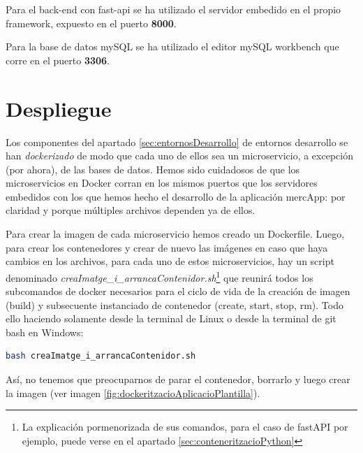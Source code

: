 \documentclass[a4paper,12pt]{report}
\begin{document}
				Para el back-end con fast-api se ha utilizado el servidor embedido en el propio framework, expuesto en el puerto \textbf{8000}.
				
				Para la base de datos mySQL se ha utilizado el editor mySQL workbench que corre en el puerto \textbf{3306}.
		
	
			\section{Despliegue}
			\label{sec:despliegue}
				Los componentes del apartado \ref{sec:entornosDesarrollo} de entornos  desarrollo se han \textit{dockerizado} de modo que cada uno de ellos sea un microservicio, a excepción (por ahora), de las bases de datos. Hemos sido cuidadosos de que los microservicios en Docker corran en los mismos puertos que los servidores embedidos con los que hemos hecho el desarrollo de la aplicación mercApp: por claridad y porque múltiples archivos dependen ya de ellos.
				
				Para crear la imagen de cada microservicio hemos creado un Dockerfile. Luego, para crear los contenedores y crear de nuevo las imágenes en caso que haya cambios en los archivos, para cada uno de estos microservicios, hay un script denominado \textit{creaImatge\_i\_arrancaContenidor.sh}\footnote{La explicación pormenorizada de sus comandos, para el caso de fastAPI por ejemplo, puede verse en el apartado \ref{sec:conteneritzacioPython}} que reunirá todos los subcomandos de docker necesarios para el ciclo de vida de la creación de imagen (build) y subsecuente instanciado de contenedor (create, start, stop, rm). Todo ello haciendo solamente desde la terminal de Linux o desde la terminal de git bash en Windows: 
				
				\begin{lstlisting}[language=bash]
	bash creaImatge_i_arrancaContenidor.sh
				\end{lstlisting}
				
				
				
				
				
				Así, no tenemos que preocuparnos de parar el contenedor, borrarlo y luego crear la imagen (ver imagen \ref{fig:dockeritzacioAplicacioPlantilla}).
				
\end{document}

